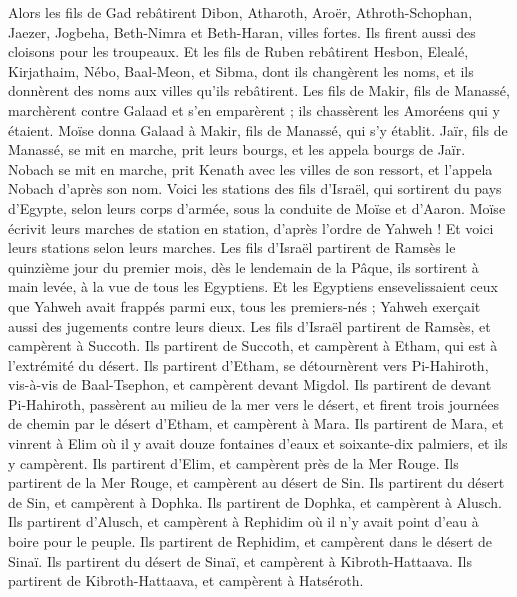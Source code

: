 \begin{multicols}{2}
Alors les fils de Gad rebâtirent Dibon, Atharoth, Aroër,
Athroth-Schophan, Jaezer, Jogbeha,
Beth-Nimra et Beth-Haran, villes fortes. Ils firent aussi des cloisons pour les troupeaux.
Et les fils de Ruben rebâtirent Hesbon, Elealé, Kirjathaim,
Nébo, Baal-Meon, et Sibma, dont ils changèrent les noms, et ils donnèrent des noms aux villes qu'ils rebâtirent.
Les fils de Makir, fils de Manassé, marchèrent contre Galaad et s’en emparèrent ; ils chassèrent les Amoréens qui y étaient.
Moïse donna Galaad à Makir, fils de Manassé, qui s’y établit.
Jaïr, fils de Manassé, se mit en marche, prit leurs bourgs, et les appela bourgs de Jaïr.
Nobach se mit en marche, prit Kenath avec les villes de son ressort, et l'appela Nobach d’après son nom.
\VerseOne{}Voici les stations des fils d'Israël, qui sortirent du pays d'Egypte, selon leurs corps d’armée, sous la conduite de Moïse et d'Aaron.
Moïse écrivit leurs marches de station en station, d’après l’ordre de Yahweh ! Et voici leurs stations selon leurs marches.
Les fils d'Israël partirent de Ramsès le quinzième jour du premier mois, dès le lendemain de la Pâque, ils sortirent à main levée, à la vue de tous les Egyptiens.
Et les Egyptiens ensevelissaient ceux que Yahweh avait frappés parmi eux, tous les premiers-nés ; Yahweh exerçait aussi des jugements contre leurs dieux.
Les fils d'Israël partirent de Ramsès, et campèrent à Succoth.
Ils partirent de Succoth, et campèrent à Etham, qui est à l’extrémité du désert.
Ils partirent d'Etham, se détournèrent vers Pi-Hahiroth, vis-à-vis de Baal-Tsephon, et campèrent devant Migdol.
Ils partirent de devant Pi-Hahiroth, passèrent au milieu de la mer vers le désert, et firent trois journées de chemin par le désert d'Etham, et campèrent à Mara.
Ils partirent de Mara, et vinrent à Elim où il y avait douze fontaines d'eaux et soixante-dix palmiers, et ils y campèrent.
Ils partirent d'Elim, et campèrent près de la Mer Rouge.
Ils partirent de la Mer Rouge, et campèrent au désert de Sin.
Ils partirent du désert de Sin, et campèrent à Dophka.
Ils partirent de Dophka, et campèrent à Alusch.
Ils partirent d'Alusch, et campèrent à Rephidim où il n'y avait point d'eau à boire pour le peuple.
Ils partirent de Rephidim, et campèrent dans le désert de Sinaï.
Ils partirent du désert de Sinaï, et campèrent à Kibroth-Hattaava.
Ils partirent de Kibroth-Hattaava, et campèrent à Hatséroth.

\end{multicols}
